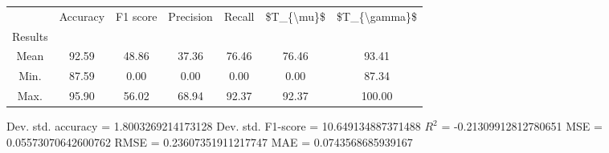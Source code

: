 \begin{tabular}{|c|c|c|c|c|c|c|}
\toprule
{} &  Accuracy &  F1 score &  Precision &  Recall &  \$T\_\{\textbackslash mu\}\$ &  \$T\_\{\textbackslash gamma\}\$ \\
Results &           &           &            &         &            &               \\
\hline
Mean    &     92.59 &     48.86 &      37.36 &   76.46 &      76.46 &         93.41 \\
Min.    &     87.59 &      0.00 &       0.00 &    0.00 &       0.00 &         87.34 \\
Max.    &     95.90 &     56.02 &      68.94 &   92.37 &      92.37 &        100.00 \\
\bottomrule
\end{tabular}

 Dev. std. accuracy = 1.8003269214173128
 Dev. std. F1-score = 10.649134887371488
 $R^2$ = -0.21309912812780651
 MSE = 0.05573070642600762
 RMSE = 0.23607351911217747
 MAE = 0.0743568685939167